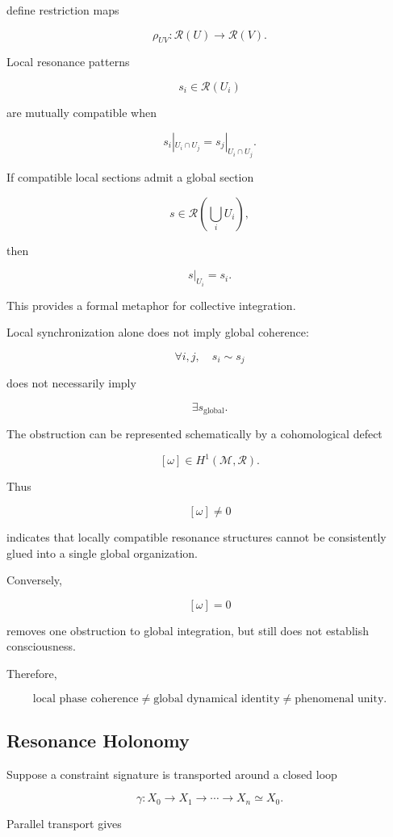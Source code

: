 \documentclass[11pt]{article}
\begin{document}
define restriction maps

\[
\rho_{UV}:
\mathscr{R}(U)
\rightarrow
\mathscr{R}(V).
\]

Local resonance patterns

\[
s_i\in\mathscr{R}(U_i)
\]

are mutually compatible when

\[
s_i|_{U_i\cap U_j}
=
s_j|_{U_i\cap U_j}.
\]

If compatible local sections admit a global section

\[
s\in
\mathscr{R}
\left(
\bigcup_iU_i
\right),
\]

then

\[
s|_{U_i}=s_i.
\]

This provides a formal metaphor for collective integration.

Local synchronization alone does not imply global coherence:

\[
\forall i,j,\quad
s_i\sim s_j
\]

does not necessarily imply

\[
\exists s_{\mathrm{global}}.
\]

The obstruction can be represented schematically by a cohomological defect

\[
[\omega]
\in
H^1(\mathcal{M},\mathscr{R}).
\]

Thus

\[
[\omega]\neq0
\]

indicates that locally compatible resonance structures cannot be consistently glued into a single global organization.

Conversely,

\[
[\omega]=0
\]

removes one obstruction to global integration, but still does not establish consciousness.

Therefore,

\[
\boxed{
\text{local phase coherence}
\neq
\text{global dynamical identity}
\neq
\text{phenomenal unity}.
}
\]

\subsection{Resonance Holonomy}

Suppose a constraint signature is transported around a closed loop

\[
\gamma:
X_0
\rightarrow
X_1
\rightarrow
\cdots
\rightarrow
X_n
\simeq
X_0.
\]

Parallel transport gives
\end{document}
